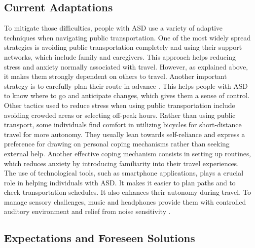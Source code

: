 \subsection{Current Adaptations}

   To mitigate those difficulties, people with ASD use a variety of adaptive techniques when navigating public transportation. 
   \newline
   \newline
   One of the most widely spread strategies is avoiding public transportation completely and using their support networks, which include family and caregivers\cite{2015DetourRightPlace}. This approach helps reducing stress and anxiety normally associated with travel. However, as explained above, it makes them strongly dependent on others to travel. 
   \newline
   \newline
    Another important strategy is to carefully plan their route in advance \cite{2020ExperiencesYoungAutistic}. This helps people with ASD to know where to go and anticipate changes, which gives them a sense of control. Other tactics used to reduce stress when using public transportation include avoiding crowded areas or selecting off-peak hours.
\newline
\newline
   Rather than using public transport, some individuals find comfort in utilizing bicycles for short-distance travel \cite{2015ViewpointsAdultsAutism} for more autonomy. They usually lean towards self-reliance and express a preference for drawing on personal coping mechanisms rather than seeking external help. Another effective coping mechanism consists in setting up routines\cite{2015ViewpointsAdultsAutism}, which reduces anxiety by introducing familiarity into their travel experiences. 
   \newline
   \newline
   The use of technological tools, such as smartphone applications, plays a crucial role in helping individuals with ASD. It makes it easier to plan paths and to check transportation schedules. It also enhances their autonomy during travel. To manage sensory challenges, music and headphones provide them with controlled auditory environment and relief from noise sensitivity \cite{2020ExperiencesYoungAutistic}. 


\subsection{Expectations and Foreseen Solutions}

